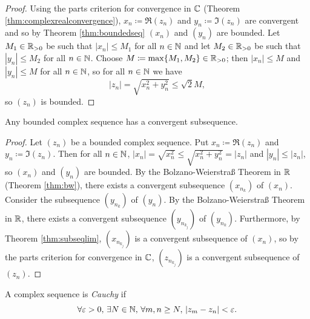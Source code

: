 \documentclass[../analysis1.tex]{subfiles}
\begin{document}
\begin{proof}
    Using the parts criterion for convergence in $\mathbb{C}$ (Theorem \ref{thm:complexrealconvergence}), $x_n\coloneqq \Re(z_n)$ and $y_n\coloneqq \Im(z_n)$ are convergent and so by Theorem \ref{thm:boundedseq} $(x_n)$ and $(y_n)$ are bounded. Let $M_1\in \mathbb{R}_{>0}$ be such that $|x_n|\le M_1$ for all $n\in\mathbb{N}$ and let $M_2\in\mathbb{R}_{>0}$ be such that $|y_n|\le M_2$ for all $n\in\mathbb{N}$.
    Choose $M\coloneqq\max\{M_1,M_2\}\in\mathbb{R}_{>0}$; then $|x_n|\le M$ and $|y_n|\le M$ for all $n\in\mathbb{N}$, so for all $n\in\mathbb{N}$ we have $$|z_n|=\sqrt{x_n^2+y_n^2}\le \sqrt{2}M,$$
    so $(z_n)$ is bounded.\qedhere
\end{proof}

\begin{theorem}
\label{thm:bw-c}
    \begin{shaded*}
        Any bounded complex sequence has a convergent subsequence. 
    \end{shaded*}
\end{theorem}
\begin{proof}
    Let $(z_n)$ be a bounded complex sequence. Put $x_n\coloneqq \Re(z_n)$ and $y_n\coloneqq \Im(z_n)$. Then for all $n\in\mathbb{N}$, $|x_n|=\sqrt{x_n^2}\le\sqrt{x_n^2+y_n^2}=|z_n|$ and $|y_n|\le |z_n|$, so $(x_n)$ and $(y_n)$ are bounded.
    By the Bolzano-Weierstraß Theorem in $\mathbb{R}$ (Theorem \ref{thm:bw}), there exists a convergent subsequence $(x_{n_k})$ of $(x_n)$. Consider the subsequence $(y_{n_k})$ of $(y_n)$. By the Bolzano-Weierstraß Theorem in $\mathbb{R}$, there exists a convergent subsequence $(y_{n_{k_j}})$ of $(y_{n_k})$.
    Furthermore, by Theorem \ref{thm:subseqlim}, $(x_{n_{k_j}})$ is a convergent subsequence of $(x_n)$, so by the parts criterion for convergence in $\mathbb{C}$, $(z_{n_{k_j}})$ is a convergent subsequence of $(z_n)$.\qedhere
\end{proof}

\begin{definition}
    \begin{shaded*}
        A complex sequence is \textit{Cauchy} if $$\forall\varepsilon>0,\,\exists N\in\mathbb{N},\,\forall m,n\ge N,\,|z_m-z_n|<\varepsilon.$$
    \end{shaded*}
\end{definition}
\end{document}
